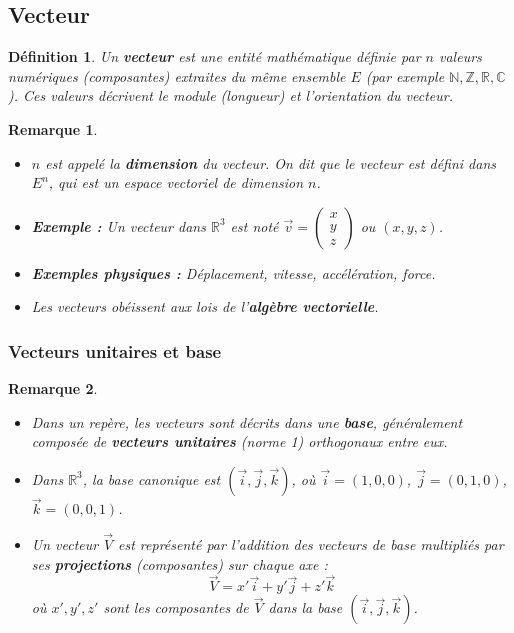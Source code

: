 \documentclass{article}
\newtheorem{definition}{Définition}
\newtheorem{remark}{Remarque}
\begin{document}
\subsection{Vecteur}
\begin{definition}
Un \textbf{vecteur} est une entité mathématique définie par $n$ valeurs numériques (composantes) extraites du même ensemble $E$ (par exemple $\mathbb{N}, \mathbb{Z}, \mathbb{R}, \mathbb{C}$). Ces valeurs décrivent le module (longueur) et l'orientation du vecteur.
\end{definition}
\begin{remark}
\begin{itemize}
    \item $n$ est appelé la \textbf{dimension} du vecteur. On dit que le vecteur est défini dans $E^n$, qui est un espace vectoriel de dimension $n$.
    \item \textbf{Exemple :} Un vecteur dans $\mathbb{R}^3$ est noté $\vec{v} = \begin{pmatrix} x \\ y \\ z \end{pmatrix}$ ou $(x, y, z)$.
    \item \textbf{Exemples physiques :} Déplacement, vitesse, accélération, force.
    \item Les vecteurs obéissent aux lois de l'\textbf{algèbre vectorielle}.
\end{itemize}
\end{remark}
\subsubsection{Vecteurs unitaires et base}
\begin{remark}
\begin{itemize}
    \item Dans un repère, les vecteurs sont décrits dans une \textbf{base}, généralement composée de \textbf{vecteurs unitaires} (norme 1) orthogonaux entre eux.
    \item Dans $\mathbb{R}^3$, la base canonique est $(\vec{i}, \vec{j}, \vec{k})$, où $\vec{i}=(1,0,0)$, $\vec{j}=(0,1,0)$, $\vec{k}=(0,0,1)$.
    \item Un vecteur $\vec{V}$ est représenté par l'addition des vecteurs de base multipliés par ses \textbf{projections} (composantes) sur chaque axe :
    \[ \vec{V} = x'\vec{i} + y'\vec{j} + z'\vec{k} \]
    où $x', y', z'$ sont les composantes de $\vec{V}$ dans la base $(\vec{i}, \vec{j}, \vec{k})$.
\end{itemize}
\end{remark}
\end{document}
